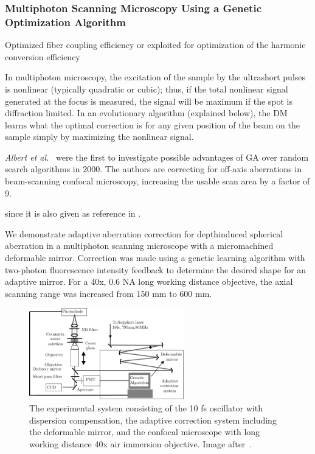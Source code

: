 \subsubsection{Multiphoton Scanning Microscopy Using a Genetic Optimization Algorithm}
\label{sec:MultiphotonScanningMicroscopyUsingIndirektSensing}

\cite{Genetic_MPFM,Genetic_smart_algorithm}

Optimized fiber coupling efficiency \cite{Genetic_fiber_coupling} or exploited for optimization of the harmonic conversion efficiency~\cite{Genetic_Harmonic_optimization}

In multiphoton microscopy, the excitation of the sample by the ultrashort pulses is nonlinear (typically quadratic or cubic); thus, if the total nonlinear signal generated at the focus is measured, the signal will be maximum if the spot is diffraction limited. In an evolutionary algorithm (explained below), the DM learns what the optimal correction is for any given position of the beam on the sample simply by maximizing the nonlinear signal. 

\emph{Albert et al.}~\cite{Genetic_smart_algorithm} were the first to investigate possible advantages of GA over random search algorithms in 2000. The authors are correcting for off-axis aberrations in beam-scanning confocal microscopy, increasing the usable scan area by a factor of 9. 

\cite{Genetic_smart_algorithm} since it is also given as reference in \cite{Genetic_MPFM}. 

\cite{Genetic_MPFM}
We demonstrate adaptive aberration correction for depthinduced spherical aberration in a multiphoton scanning microscope with a micromachined deformable mirror. Correction was made using a genetic learning algorithm with two-photon fluorescence intensity feedback to determine the desired shape for an adaptive mirror. For a 40x, 0.6 NA long working distance objective, the axial scanning range was increased from 150 mm to 600 mm.

\begin{figure}[htbp]
	\centering
		\includegraphics[width=0.60\textwidth]{images/genetic_TPFM_setup.pdf}
	\caption{The experimental system consisting of the 10 fs oscillator with dispersion compensation, the adaptive correction system including the deformable mirror, and the confocal microscope with long working distance 40x air immersion objective. Image after~\cite{Genetic_MPFM}.}
	\label{fig:genetic_TPFM_setup}
\end{figure}


